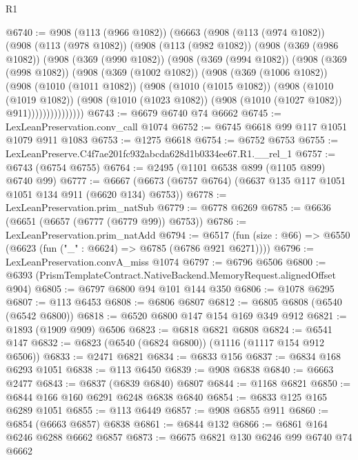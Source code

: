 \begin{lexlean}{R1}
\begin{coremodule}
@6740 := @908
    (@113 (@966 @1082))
    (@6663
      (@908
        (@113 (@974 @1082))
        (@908
          (@113 (@978 @1082))
          (@908
            (@113 (@982 @1082))
            (@908
              (@369 (@986 @1082))
              (@908
                (@369 (@990 @1082))
                (@908
                  (@369 (@994 @1082))
                  (@908
                    (@369 (@998 @1082))
                    (@908
                      (@369 (@1002 @1082))
                      (@908
                        (@369 (@1006 @1082))
                        (@908
                          (@1010 (@1011 @1082))
                          (@908
                            (@1010 (@1015 @1082))
                            (@908
                              (@1010 (@1019 @1082))
                              (@908
                                (@1010 (@1023 @1082))
                                (@908 (@1010 (@1027 @1082)) @911)))))))))))))))
@6743 := @6679 @6740 @74 @6662
@6745 := LexLeanPreservation.conv_call @1074
@6752 := @6745 @6618 @99 @117 @1051 @1079 @911 @1083
@6753 := @1275 @6618
@6754 := @6752 @6753
@6755 := LexLeanPreserve.C4f7ae201fc932abcda628d1b0334ee67.R1.__rel_1
@6757 := @6743 (@6754 @6755)
@6764 := @2495 (@1101 @6538 @899 (@1105 @899) @6740 @99)
@6777 := @6667 (@6673 (@6757 @6764) (@6637 @135 @117 @1051 @1051 @134 @911 (@6620 @134) @6753))
@6778 := LexLeanPreservation.prim_natSub
@6779 := @6778 @6269
@6785 := @6636 (@6651 (@6657 (@6777 (@6779 @99)) @6753))
@6786 := LexLeanPreservation.prim_natAdd
@6794 := @6517 (fun (size : @66) => @6550 (@6623 (fun ("_" : @6624) => @6785 (@6786 @921 @6271))))
@6796 := LexLeanPreservation.convA_miss @1074
@6797 := @6796 @6506
@6800 := @6393 (PrismTemplateContract.NativeBackend.MemoryRequest.alignedOffset @904)
@6805 := @6797 @6800 @94 @101 @144 @350
@6806 := @1078 @6295
@6807 := @113 @6453
@6808 := @6806 @6807
@6812 := @6805 @6808 (@6540 (@6542 @6800))
@6818 := @6520 @6800 @147 @154 @169 @349 @912
@6821 := @1893 (@1909 @909) @6506
@6823 := @6818 @6821 @6808
@6824 := @6541 @147
@6832 := @6823 (@6540 (@6824 @6800)) (@1116 (@1117 @154 @912 @6506))
@6833 := @2471 @6821
@6834 := @6833 @156
@6837 := @6834 @168 @6293 @1051
@6838 := @113 @6450
@6839 := @908 @6838
@6840 := @6663 @2477
@6843 := @6837 (@6839 @6840) @6807
@6844 := @1168 @6821
@6850 := @6844 @166 @160 @6291 @6248 @6838 @6840
@6854 := @6833 @125 @165 @6289 @1051
@6855 := @113 @6449
@6857 := @908 @6855 @911
@6860 := @6854 (@6663 @6857) @6838
@6861 := @6844 @132
@6866 := @6861 @164 @6246 @6288 @6662 @6857
@6873 := @6675 @6821 @130 @6246 @99 @6740 @74 @6662

\end{coremodule}
\end{lexlean}
